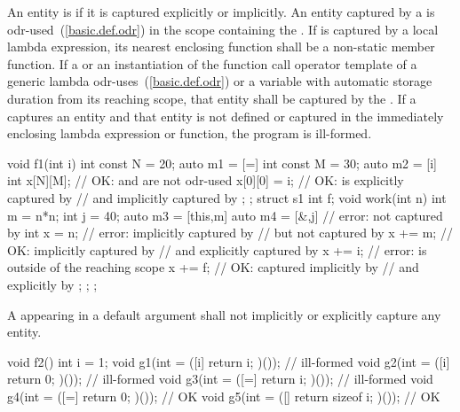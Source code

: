 \pnum
An entity is  if it is captured explicitly or implicitly. An entity
captured by a  is odr-used~(\ref{basic.def.odr}) in the scope
containing the . If  is captured by a local
lambda expression, its nearest enclosing function shall be a non-static member function.
If a  or an instantiation of the function call
operator template of a generic lambda odr-uses~(\ref{basic.def.odr})  or a
variable with automatic storage duration from its reaching scope, that
entity shall be captured by the . If a
 captures an entity and that entity is not defined or
captured in the immediately enclosing lambda expression or function, the program is
ill-formed. \enterexample
\begin{codeblock}
void f1(int i) {
  int const N = 20;
  auto m1 = [=]{
    int const M = 30;
    auto m2 = [i]{
      int x[N][M];              // OK:  and  are not odr-used
      x[0][0] = i;              // OK:  is explicitly captured by 
                                // and implicitly captured by 
    };
  };
  struct s1 {
    int f;
    void work(int n) {
      int m = n*n;
      int j = 40;
      auto m3 = [this,m] {
        auto m4 = [&,j] {       // error:  not captured by 
          int x = n;            // error:  implicitly captured by 
                                // but not captured by 
          x += m;               // OK:  implicitly captured by 
                                // and explicitly captured by 
          x += i;               // error:  is outside of the reaching scope
          x += f;               // OK:  captured implicitly by 
                                // and explicitly by 
        };
      };
    }
  };
}
\end{codeblock}
\exitexample

\pnum
A  appearing in a default argument shall not
implicitly or explicitly capture any entity. \enterexample

\begin{codeblock}
void f2() {
  int i = 1;
  void g1(int = ([i]{ return i; })());        // ill-formed
  void g2(int = ([i]{ return 0; })());        // ill-formed
  void g3(int = ([=]{ return i; })());        // ill-formed
  void g4(int = ([=]{ return 0; })());        // OK
  void g5(int = ([]{ return sizeof i; })());  // OK
}
\end{codeblock}
\exitexample

